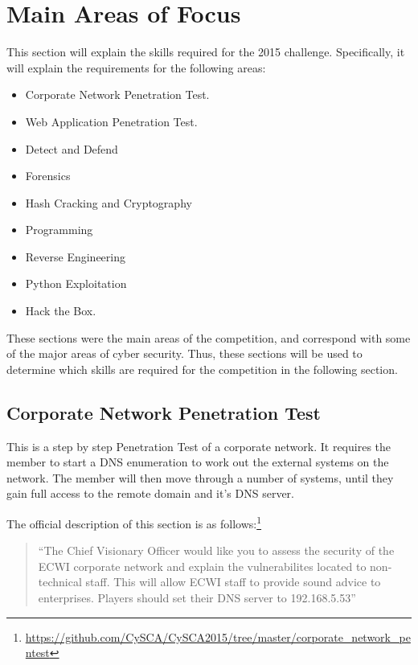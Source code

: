 \documentclass[a4paper,11pt]{report}
\begin{document}
	\section{Main Areas of Focus}
		This section will explain the skills required for the 2015 challenge. 
		Specifically, it will explain the requirements for the following areas:
		\begin{itemize}
			\item Corporate Network Penetration Test.
			\item Web Application Penetration Test. 
			\item Detect and Defend
			\item Forensics
			\item Hash Cracking and Cryptography
			\item Programming
			\item Reverse Engineering
			\item Python Exploitation
			\item Hack the Box. 
		\end{itemize}
		These sections were the main areas of the competition, and correspond with some of the major areas of cyber security. 
		Thus, these sections will be used to determine which skills are required for the competition in the following section. 
		\subsection{Corporate Network Penetration Test}
			This is a step by step Penetration Test of a corporate network. 
			It requires the member to start a DNS enumeration to work out the external systems on the network. 
			The member will then move through a number of systems, 
			until they gain full access to the remote domain and it's DNS server. 

			The official description of this section is as follows:\footnote{\url{https://github.com/CySCA/CySCA2015/tree/master/corporate\_network\_pentest}}
			\begin{quote}
				``The Chief Visionary Officer would like you to assess the security of the ECWI corporate network and explain the vulnerabilites located to non-technical staff. This will allow ECWI staff to provide sound advice to enterprises. Players should set their DNS server to 192.168.5.53''
			\end{quote}
\end{document}
